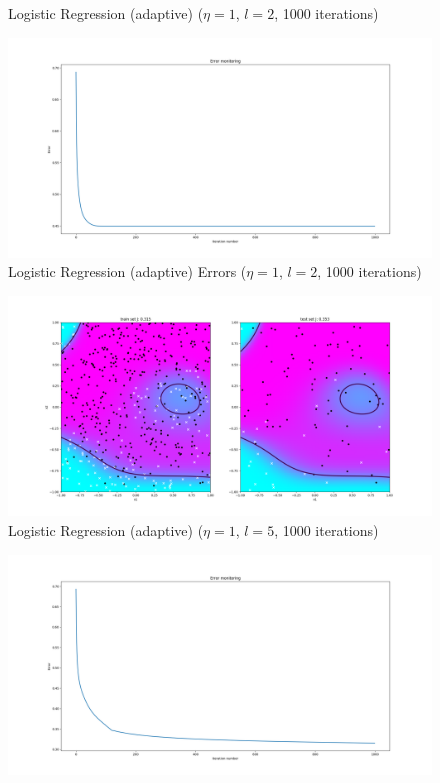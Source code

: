 \documentclass[12pt,halfline,a4paper]{ouparticle}
\begin{document}
\begin{enumerate}
\begin{figure}[H]
	    \caption{Logistic Regression (adaptive) ($\eta = 1$, $l = 2$, 1000
	    iterations)}
	\end{figure}
	\begin{figure}[H]
  	\centering
	        \includegraphics[width=\textwidth]{figures/logreg_adapt_2_error.png}
	    \caption{Logistic Regression (adaptive) Errors ($\eta = 1$, $l = 2$, 1000
	    iterations)}
	\end{figure}
	\begin{figure}[H]
  	\centering
	        \includegraphics[width=\textwidth]{figures/logreg_adapt_5.png}
	    \caption{Logistic Regression (adaptive) ($\eta = 1$, $l = 5$, 1000
	    iterations)}
	\end{figure}
	\begin{figure}[H]
  	\centering
	        \includegraphics[width=\textwidth]{figures/logreg_adapt_5_error.png}

\end{figure}
\end{enumerate}
\end{document}
